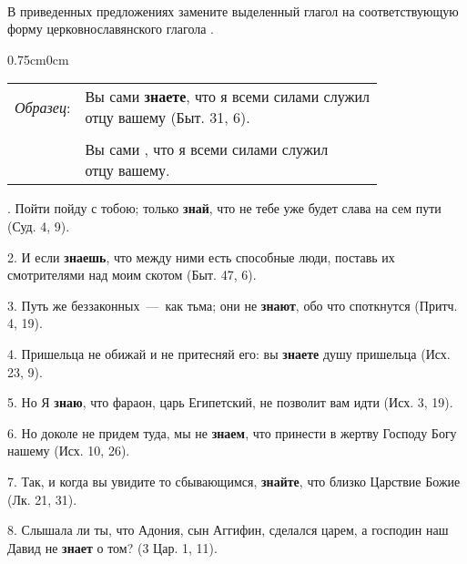 \documentclass[11pt,a4paper,oneside]{memoir}
\newcommand{\exercise}{}
\newcommand{\exanswer}{\ding{242}}
\newcommand{\hstbb}{0.75cm}
\begin{document}
\addtocounter{paragraph}{1} %

\bigskip\paragraph{\exercise}

В приведенных предложениях замените выделенный глагол на соответствующую форму церковнославянского глагола {}.

\medskip\begin{adjustwidth}{\hstbb}{0cm}
	\renewcommand*{\arraystretch}{1.2}
	\begin{tabular}[l]{rl}

		\emph{Образец}:
		 & \makecell[l]{Вы сами \textbf{знаете}, что я всеми силами служил \\отцу вашему (Быт. 31, 6).}
		\\

		 &
		\\

		\exanswer
		 & \makecell[l]{Вы сами {\slv{вѣ́сте}}, что я всеми силами служил   \\отцу вашему.}
		\\
	\end{tabular}
\end{adjustwidth}

. Пойти пойду с тобою; только \textbf{знай}, что не тебе уже будет слава на сем пути (Суд. 4, 9).

2. И если \textbf{знаешь}, что между ними есть способные люди, поставь их смотрителями над моим скотом (Быт. 47, 6).

3. Путь же беззаконных~---~как тьма; они не \textbf{знают}, обо что споткнутся (Притч. 4, 19).

4. Пришельца не обижай и не притесняй его: вы \textbf{знаете} душу пришельца (Исх. 23, 9).

5. Но Я \textbf{знаю}, что фараон, царь Египетский, не позволит вам идти (Исх. 3, 19).

6. Но доколе не придем туда, мы не \textbf{знаем}, что принести в жертву Господу Богу нашему (Исх. 10, 26).

7. Так, и когда вы увидите то сбывающимся, \textbf{знайте}, что близко Царствие Божие (Лк. 21, 31).

8. Слышала ли ты, что Адония, сын Аггифин, сделался царем, а господин наш Давид не \textbf{знает} о том? (3 Цар. 1, 11).

\paragraph{\exercise}
\end{document}
